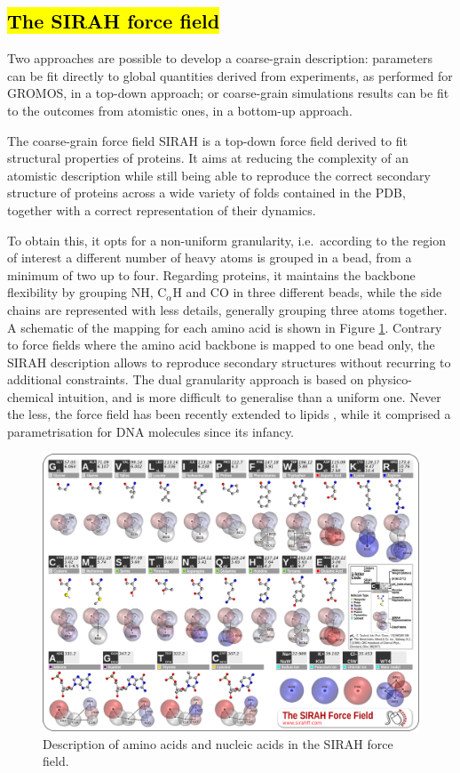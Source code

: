 \subsection{\hl{The SIRAH force field}}
Two approaches are possible to develop a coarse-grain description: parameters can be fit directly to global quantities derived from experiments, as performed for GROMOS, in a top-down approach; or coarse-grain simulations results can be fit to the outcomes from atomistic ones, in a bottom-up approach.

The coarse-grain force field SIRAH \cite{Machado2018,Barrera2019} is a top-down force field derived to fit structural properties of proteins. It aims at reducing the complexity of an atomistic description while still being able to reproduce the correct secondary structure of proteins across a wide variety of folds contained in the PDB, together with a correct representation of their dynamics.

To obtain this, it opts for a non-uniform granularity, i.e.\ according to the region of interest a different number of heavy atoms is grouped in a bead, from a minimum of two up to four. Regarding proteins, it maintains the backbone flexibility by grouping NH, C$_\alpha$H and CO in three different beads, while the side chains are represented with less details, generally grouping three atoms together. A schematic of the mapping for each amino acid is shown in Figure \ref{fig:sirah}. Contrary to force fields where the amino acid backbone is mapped to one bead only, the SIRAH description allows to reproduce secondary structures without recurring to additional constraints.
%
The dual granularity approach is based on physico-chemical intuition, and is more difficult to generalise than a uniform one. Never the less, the force field has been recently extended to lipids \cite{Barrera2019}, while it comprised a parametrisation for DNA molecules since its infancy.
%
\begin{figure}[h!]
\centering
\includegraphics[width=0.8\linewidth]{2methods/pics/sirah_aa.png}
%
\caption[SIRAH force field amino acid and DNA description]{Description of amino acids and nucleic acids in the SIRAH force field.}
\label{fig:sirah}
\end{figure}


